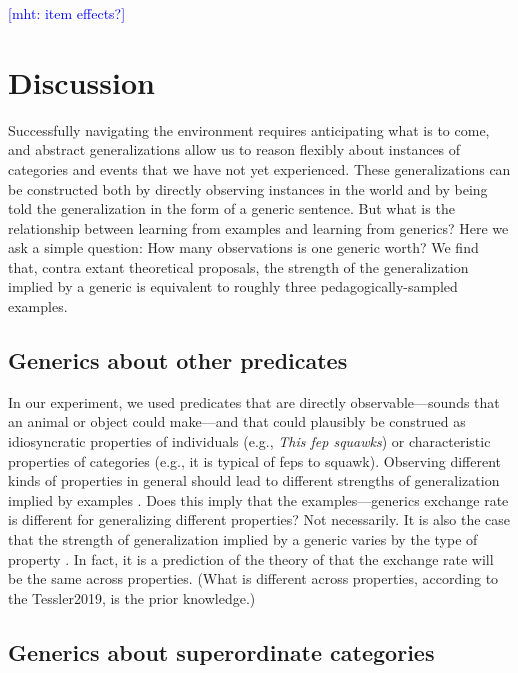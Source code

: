 \documentclass[10pt,letterpaper]{article}
\newcommand{\mht}[1]{\textcolor{Blue}{[mht: #1]}}
\begin{document}
\mht{item effects?}

\section{Discussion}

Successfully navigating the environment requires anticipating what is to come, and abstract generalizations allow us to reason flexibly about instances of categories and events that we have not yet experienced. 
These generalizations can be constructed both by directly observing instances in the world and by being told the generalization in the form of a generic sentence. 
But what is the relationship between learning from examples and learning from generics? 
Here we ask a simple question: How many observations is one generic worth?
We find that, contra extant theoretical proposals, the strength of the generalization implied by a generic is equivalent to roughly three pedagogically-sampled examples. 

\subsection{Generics about other predicates}

In our experiment, we used predicates that are directly observable---sounds that an animal or object could make---and that could plausibly be construed as idiosyncratic properties of individuals (e.g., \emph{This fep squawks}) or characteristic properties of categories (e.g., it is typical of feps to squawk).
Observing different kinds of properties in general should lead to different strengths of generalization implied by examples \cite{Nisbett1983}. 
Does this imply that the examples---generics exchange rate is different for generalizing different properties?
Not necessarily.
It is also the case that the strength of generalization implied by a generic varies by the type of property \cite{Tessler2020}. 
In fact, it is a prediction of the theory of  that the exchange rate will be the same across properties. (What is different across properties, according to the Tessler2019, is the prior knowledge.)

\subsection{Generics about superordinate categories}
\end{document}
